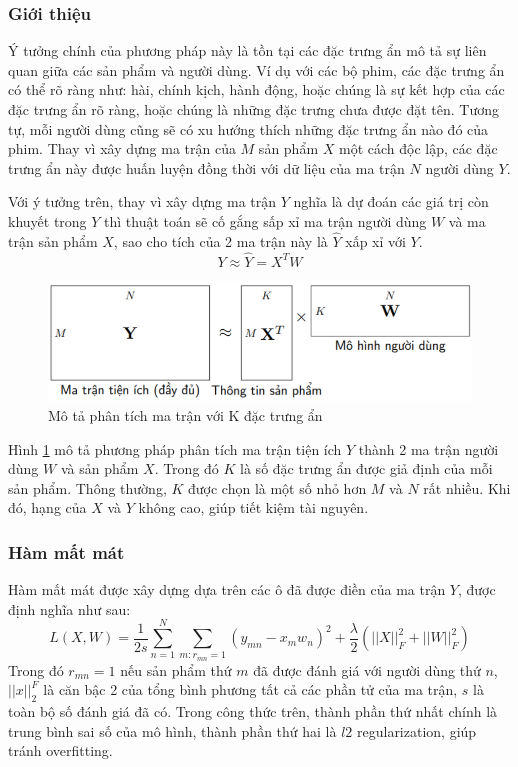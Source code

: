 \subsubsection{Giới thiệu}
Ý tưởng chính của phương pháp này là tồn tại các đặc trưng ẩn mô tả sự liên quan
giữa các sản phẩm và người dùng. Ví dụ với các bộ phim, các đặc trưng ẩn có thể rõ 
ràng như: hài, chính kịch, hành động, hoặc chúng là sự kết hợp của các đặc trưng ẩn rõ
ràng, hoặc chúng là những đặc trưng chưa được đặt tên. Tương tự, mỗi người dùng cũng
sẽ có xu hướng thích những đặc trưng ẩn nào đó của phim. Thay vì xây dựng ma trận
của $M$ sản phẩm $X$ một cách độc lập, các đặc trưng ẩn này được huấn luyện đồng thời
với dữ liệu của ma trận $N$ người dùng $Y$.

Với ý tưởng trên, thay vì xây dựng ma trận $Y$ nghĩa là dự đoán các giá trị còn khuyết
trong $Y$ thì thuật toán sẽ cố gắng sấp xỉ ma trận người dùng $W$ và ma trận sản phẩm $X$,
sao cho tích của 2 ma trận này là $\hat{Y}$ xấp xỉ với $Y$.
$$Y \approx \hat{Y} = X^TW$$
\begin{figure}[h]
    \centering
    \includegraphics[width=1\linewidth]{imgs//chapter_2/utility_matrix.png}
    \caption{Mô tả phân tích ma trận với K đặc trưng ẩn}
    \label{utility_matrix}
\end{figure}

Hình \ref{utility_matrix} mô tả phương pháp phân tích ma trận tiện ích $Y$ thành 2 ma trận người dùng $W$ và sản phẩm $X$. Trong đó $K$ là số đặc trưng ẩn được giả định của mỗi sản phẩm. Thông thường, $K$ được chọn là một số nhỏ hơn $M$ và $N$ rất nhiều. Khi đó, hạng của $X$ và $Y$ không cao, giúp tiết kiệm tài nguyên.

\subsubsection{Hàm mất mát}
Hàm mất mát được xây dựng dựa trên các ô đã được điền của ma trận $Y$, được định nghĩa như sau:
\begin{equation}
    L(X, W) = \frac{1}{2s}\sum^N_{n=1}\sum_{m:r_{mn}=1}(y_{mn}-x_m w_n)^2+\frac{\lambda}{2}(||X||^2_F + ||W||^2_F)
\end{equation}
Trong đó $r_{mn} = 1$ nếu sản phẩm thứ $m$ đã được đánh giá với người dùng thứ $n$, $||x||^F_2$
là căn bậc 2 của tổng bình phương tất cả các phần tử của ma trận, $s$ là toàn bộ số đánh
giá đã có. Trong công thức trên, thành phần thứ nhất chính là trung bình sai số của mô
hình, thành phần thứ hai là $l2$ regularization, giúp tránh overfitting.

